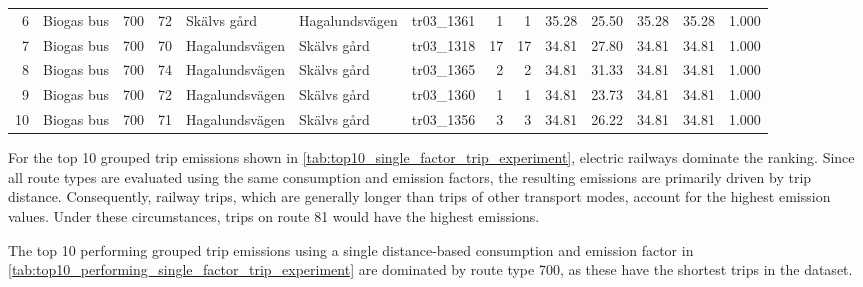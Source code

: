 \begin{table}[H]
{\begin{tabular}{
r
>{\raggedright\arraybackslash}p{1.7cm}
r
r
>{\raggedright\arraybackslash}p{2.1cm}
>{\raggedright\arraybackslash}p{2.1cm}
>{\raggedright\arraybackslash}p{1.7cm}
r
r
r
r
r
r
r
}
6 & Biogas bus & 700 & 72 & \cellcolor{green!20}Skälvs gård & \cellcolor{green!20}Hagalundsvägen & tr03\_1361 & 1 & 1 & 35.28 & 25.50 & 35.28 & 35.28 & 1.000 \\
7 & Biogas bus & 700 & 70 & \cellcolor{green!20}Hagalundsvägen & \cellcolor{green!20}Skälvs gård & tr03\_1318 & 17 & 17 & 34.81 & 27.80 & 34.81 & 34.81 & 1.000 \\
8 & Biogas bus & 700 & 74 & \cellcolor{green!20}Hagalundsvägen & \cellcolor{green!20}Skälvs gård & tr03\_1365 & 2 & 2 & 34.81 & 31.33 & 34.81 & 34.81 & 1.000 \\
9 & Biogas bus & 700 & 72 & \cellcolor{green!20}Hagalundsvägen & \cellcolor{green!20}Skälvs gård & tr03\_1360 & 1 & 1 & 34.81 & 23.73 & 34.81 & 34.81 & 1.000 \\
10 & Biogas bus & 700 & 71 & \cellcolor{green!20}Hagalundsvägen & \cellcolor{green!20}Skälvs gård & tr03\_1356 & 3 & 3 & 34.81 & 26.22 & 34.81 & 34.81 & 1.000 \\
\bottomrule
\end{tabular}%
}
\end{table}



For the top 10 grouped trip emissions shown in \autoref{tab:top10_single_factor_trip_experiment}, electric railways dominate the ranking. Since all route types are evaluated using the same consumption and emission factors, the resulting emissions are primarily driven by trip distance. Consequently, railway trips, which are generally longer than trips of other transport modes, account for the highest emission values. Under these circumstances, trips on route 81 would have the highest emissions.

The top 10 performing grouped trip emissions using a single distance-based consumption and emission factor in \autoref{tab:top10_performing_single_factor_trip_experiment} are dominated by route type 700, as these have the shortest trips in the dataset. 



